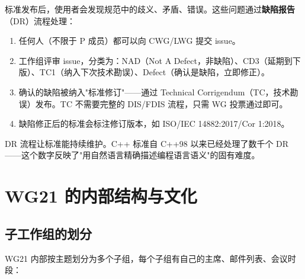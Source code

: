 \documentclass[12pt,a4paper,fontset=fandol]{ctexbook}
\begin{document}
标准发布后，使用者会发现规范中的歧义、矛盾、错误。这些问题通过\textbf{缺陷报告}（DR）流程处理：

\begin{enumerate}
  \item 任何人（不限于 P 成员）都可以向 CWG/LWG 提交 issue。
  \item 工作组评审 issue，分类为：NAD（Not A Defect，非缺陷）、CD3（延期到下版）、TC1（纳入下次技术勘误）、Defect（确认是缺陷，立即修正）。
  \item 确认的缺陷被纳入"标准修订"——通过 Technical Corrigendum（TC，技术勘误）发布。TC 不需要完整的 DIS/FDIS 流程，只需 WG 投票通过即可。
  \item 缺陷修正后的标准会标注修订版本，如 ISO/IEC 14882:2017/Cor 1:2018。
\end{enumerate}

DR 流程让标准能持续维护。C++ 标准自 C++98 以来已经处理了数千个 DR——这个数字反映了"用自然语言精确描述编程语言语义"的固有难度。

\chapter{WG21 的内部结构与文化}

\section{子工作组的划分}

WG21 内部按主题划分为多个子组，每个子组有自己的主席、邮件列表、会议时段：
\end{document}
